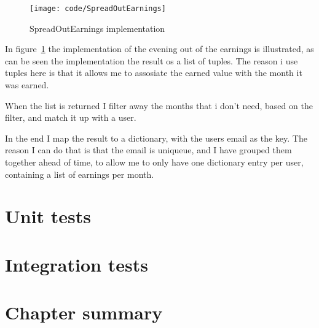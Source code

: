 \begin{figure}
  \texttt{[image: code/SpreadOutEarnings]}
  \caption{SpreadOutEarnings implementation}
  \label{fig:spreadoutearnings}
\end{figure}

In figure~\ref{fig:spreadoutearnings} the implementation of the evening out of
the earnings is illustrated, as can be seen the implementation the result os a
list of tuples. The reason i use tuples here is that it allows me to assosiate
the earned value with the month it was earned.

When the list is returned I filter away the months that i don't need, based on
the filter, and match it up with a user.

In the end I map the result to a dictionary, with the users email as the key.
The reason I can do that is that the email is uniqueue, and I have grouped them
together ahead of time, to allow me to only have one dictionary entry per user,
containing a list of earnings per month.

\section{Unit tests}
\label{sec:unit_tests}

\section{Integration tests}
\label{sec:integration_tests}

\section{Chapter summary}

